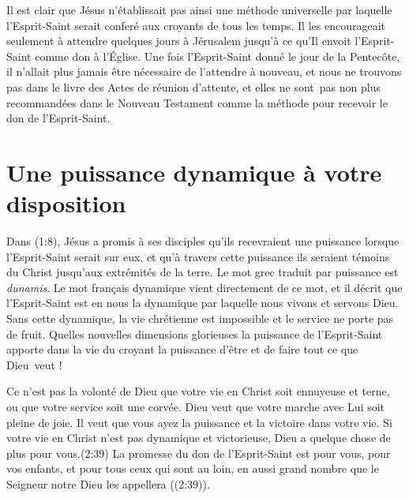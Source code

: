 Il est clair que Jésus n'établissait pas ainsi une méthode universelle par
 laquelle l'Esprit-Saint serait conferé aux croyants de tous les temps. Il les
 encourageait seulement à attendre quelques jours à Jérusalem jusqu'à ce
 qu'Il envoit l'Esprit-Saint comme don à l'Église. Une fois l'Esprit-Saint
 donné le jour de la Pentecôte, il n'allait plus jamais être nécessaire de
 l'attendre à nouveau, et nous ne trouvons pas dans
 le livre des Actes de réunion d'attente, et elles ne sont~pas non plus
 recommandées dans le Nouveau Testament comme la méthode pour recevoir le don de
 l'Esprit-Saint.


\section{Une puissance dynamique à votre disposition}

Dans (1:8), Jésus a promis à ses disciples
 qu'ils recevraient une puissance lorsque l'Esprit-Saint serait
 sur eux, et qu'à travers cette puissance ils seraient témoins
 du Christ jusqu'aux extrémités de la terre.
 Le mot grec traduit par \Og puissance \Fg{} est \emph{dunamis}.
 Le mot français \Og dynamique \Fg{} vient directement de ce mot,
 et il décrit que l'Esprit-Saint est en nous \ocadr la dynamique par laquelle
 nous vivons et servons Dieu. Sans cette dynamique, la vie chrétienne est
 impossible et le service ne porte pas de fruit.
 Quelles nouvelles dimensions glorieuses la puissance de l'Esprit-Saint
 apporte dans la vie du croyant \ocadr la puissance d'être et de faire
 tout ce que Dieu~veut !

Ce n'est pas la volonté de Dieu que votre vie en Christ soit ennuyeuse
 et terne, ou que votre service soit une corvée.
 Dieu veut que votre marche avec Lui soit pleine de joie.
 Il veut que vous ayez la puissance et la victoire dans votre vie.
 Si votre vie en Christ n'est pas dynamique et victorieuse,
 Dieu a quelque chose de plus pour vous.(2:39)
 La promesse du don de l'Esprit-Saint est \Og pour vous, pour vos enfants,
 et pour tous ceux qui sont au loin,
 en aussi grand nombre que le Seigneur notre Dieu les appellera \Fg{}
 ((2:39)).
\closechapter
